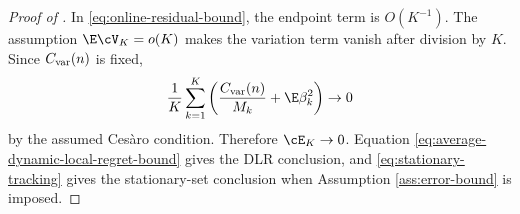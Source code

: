 \begin{proof}[Proof of ]
In \eqref{eq:online-residual-bound}, the endpoint term is $O(K^{-1})$.  The assumption $\E\cV_K=o(K)$ makes the variation term vanish after division by $K$.  Since $C_{\rm var}(n)$ is fixed,
\[
 \frac1K\sum_{k=1}^{K}\left(\frac{C_{\rm var}(n)}{M_k}+\E\beta_k^2\right)\to0
\]
by the assumed Ces\`aro condition.  Therefore $\cE_K\to0$.  Equation \eqref{eq:average-dynamic-local-regret-bound} gives the DLR conclusion, and \eqref{eq:stationary-tracking} gives the stationary-set conclusion when Assumption \ref{ass:error-bound} is imposed.
\end{proof}
